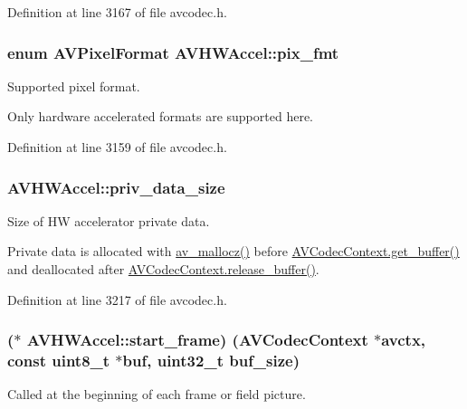 Definition at line 3167 of file avcodec.\+h.

\subsubsection[{\texorpdfstring{pix\+\_\+fmt}{pix_fmt}}]{\setlength{\rightskip}{0pt plus 5cm}enum {\bf A\+V\+Pixel\+Format} A\+V\+H\+W\+Accel\+::pix\+\_\+fmt}\hypertarget{struct_a_v_h_w_accel_ac5692f044266af8c1c33b7ac549df338}{}\label{struct_a_v_h_w_accel_ac5692f044266af8c1c33b7ac549df338}
Supported pixel format.

Only hardware accelerated formats are supported here. 

Definition at line 3159 of file avcodec.\+h.

\subsubsection[{\texorpdfstring{priv\+\_\+data\+\_\+size}{priv_data_size}}]{ A\+V\+H\+W\+Accel\+::priv\+\_\+data\+\_\+size}\hypertarget{struct_a_v_h_w_accel_a0094df5ea13d644ebcba1237d45055be}{}\label{struct_a_v_h_w_accel_a0094df5ea13d644ebcba1237d45055be}
Size of HW accelerator private data.

Private data is allocated with \hyperlink{group__lavu__mem_gaf143ecab33a3868b57345466c39de7c1}{av\+\_\+mallocz()} before \hyperlink{struct_a_v_codec_context_abc3a806b73306162efa218510448d54f}{A\+V\+Codec\+Context.\+get\+\_\+buffer()} and deallocated after \hyperlink{struct_a_v_codec_context_ac934a388c7779e800c13914ff00b6916}{A\+V\+Codec\+Context.\+release\+\_\+buffer()}. 

Definition at line 3217 of file avcodec.\+h.

\subsubsection[{\texorpdfstring{start\+\_\+frame}{start_frame}}]{($\ast$ A\+V\+H\+W\+Accel\+::start\+\_\+frame) ({\bf A\+V\+Codec\+Context} $\ast$avctx, {\bf const} {\bf uint8\+\_\+t} $\ast${\bf buf}, {\bf uint32\+\_\+t} buf\+\_\+size)}\hypertarget{struct_a_v_h_w_accel_a40b92f781dbaaecc9c82f636b790629b}{}\label{struct_a_v_h_w_accel_a40b92f781dbaaecc9c82f636b790629b}
Called at the beginning of each frame or field picture.

